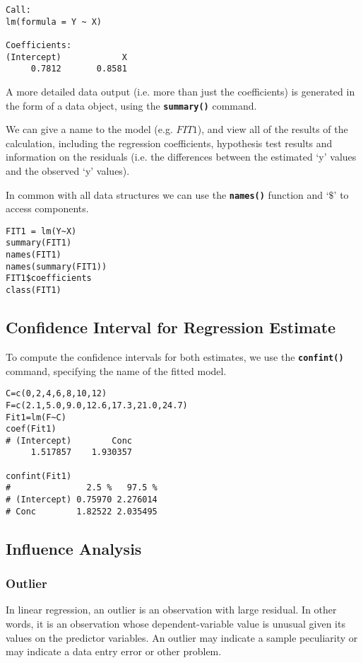 \begin{verbatim}
Call:
lm(formula = Y ~ X)

Coefficients:
(Intercept)            X
     0.7812       0.8581
\end{verbatim}

A more detailed data output (i.e. more than just the coefficients) is generated in the form of a data object, using the \textbf{\texttt{summary()}} command.

We can give a name to the model (e.g. $FIT1$), and view all of the results of the calculation, including the regression coefficients, hypothesis test results and information on the residuals (i.e. the differences between the estimated ‘y’ values and the observed ‘y’ values).

In common with all data structures we can use the \textbf{\texttt{names()}} function and ‘$\$$’ to access components.

\begin{framed}
\begin{verbatim}
FIT1 = lm(Y~X)
summary(FIT1)
names(FIT1)
names(summary(FIT1))
FIT1$coefficients
class(FIT1)
\end{verbatim}
\end{framed}
\newpage
\subsection{Confidence Interval for Regression Estimate}
To compute the confidence intervals for both estimates, we use the \texttt\textbf{{confint()}} command, specifying the name of the fitted model.
\begin{framed}
\begin{verbatim}
C=c(0,2,4,6,8,10,12)
F=c(2.1,5.0,9.0,12.6,17.3,21.0,24.7)
Fit1=lm(F~C)
coef(Fit1)
# (Intercept)        Conc
     1.517857    1.930357

confint(Fit1)
#               2.5 %   97.5 %
# (Intercept) 0.75970 2.276014
# Conc        1.82522 2.035495
\end{verbatim}
\end{framed}
\subsection{Influence Analysis}


\subsubsection{Outlier} In linear regression, an outlier is an observation with large residual.  In other words, it is an observation whose dependent-variable value is unusual given its values on the predictor variables.  An outlier may indicate a sample peculiarity or may indicate a data entry error or other problem.
